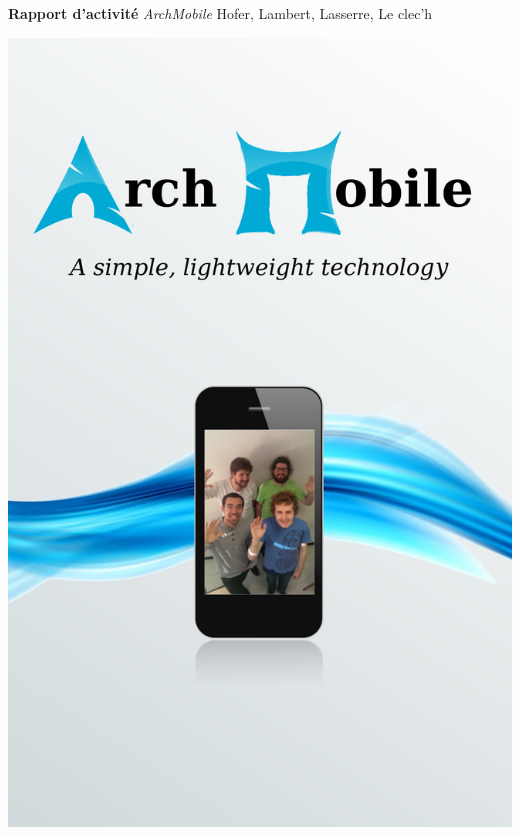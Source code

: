 \documentclass[a4paper, 12pt]{article}
\def\projet{Rapport d'activité}
\def\titre{ArchMobile}
\def\others{Hofer, Lambert, Lasserre, Le clec'h}
\begin{document}
\begin{center}
\vspace*{10mm}
\Huge{\bfseries \sffamily \projet}
\vskip 20mm
\huge{ \itshape \titre}
\vskip 10mm
\huge{ \sffamily \others}
\vskip 5mm
\end{center}


\vskip 15mm
\begin{minipage}{.49\textwidth}
  \includegraphics[width=\linewidth]{flyer}
\end{minipage}
\end{document}
